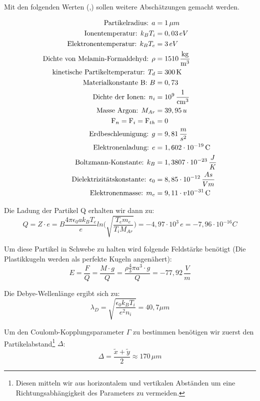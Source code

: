 Mit den folgenden Werten (\cite{1},\cite{TR}) sollen weitere Abschätzungen gemacht werden.

\begin{align}
\text{Partikelradius: }a &= 1\,\mu m \notag\\
\text{Ionentemperatur: }k_BT_i &= 0, 03\,eV\notag\\
\text{Elektronentemperatur: }k_BT_e &= 3\,eV\notag\\
\text{Dichte von Melamin-Formaldehyd: }\rho &= 1510\,\frac{\text{kg}}{\text{m}^3}\notag\\
\text{kinetische Partikeltemperatur: }T_d &= 300\,\text{K}\notag\\
\text{Materialkonstante B: }B&=0,73\notag\\
\text{Dichte der Ionen: }n_i &= 10^9\,\frac{1}{\text{cm}^3}\notag\\
\text{Masse Argon: }M_{Ar}&=39,95\,u\notag\\
\text{F}_n = \text{F}_i = \text{F}_{th} &= 0\notag\\
\text{Erdbeschleunigung: }g&=9,81\,\frac{m}{s^2}\notag\\
\text{Elektronenladung: }e&=1,602\cdot 10^{-19}\,\text{C}\notag\\
\text{Boltzmann-Konstante: }k_B&=1,3807\cdot 10^{-23}\,\frac{J}{K}\notag\\
\text{Dielektrizitätskonstante: }\epsilon_0&=8,85\cdot 10^{-12}\,\frac{As}{Vm}\notag\\
\text{Elektronenmasse: }m_e&=9,11\cdot v10^{-31}\,\text{C}\notag\\
\end{align}


Die Ladung der Partikel Q erhalten wir dann zu:
$$
    Q=Z\cdot e=B\frac{4\pi\epsilon_0ak_BT_e}{e}ln\Big( \sqrt{\frac{T_em_e}{T_iM_{Ar}}}\Big)=-4,97\cdot 10^3\,e=-7,96\cdot 10^{-16}C
$$
  
Um diese Partikel in Schwebe zu halten wird folgende Feldstärke benötigt (Die Plastikkugeln werden als perfekte Kugeln angenähert):
$$
    E=\frac{F}{Q}=\frac{M\cdot g}{Q}=\frac{\rho \frac{4}{3}\pi a^3\cdot g}{Q}=-77,92\,\frac{V}{m}
$$

Die Debye-Wellenlänge ergibt sich zu:
$$
    \lambda_D=\sqrt{\frac{\epsilon_0k_BT_i}{e^2n_i}}=40,7\mu m
$$

Um den Coulomb-Kopplungsparameter $\Gamma$ zu bestimmen benötigen wir zuerst den Partikelabstand\footnote{Diesen mitteln wir aus horizontalem und vertikalen Abständen um eine Richtungsabhängigkeit des Parameters zu vermeiden.} $\Delta$:
$$
    \Delta=\frac{\tilde{x}+\tilde{y}}{2}\approx170\,\mu m
$$

